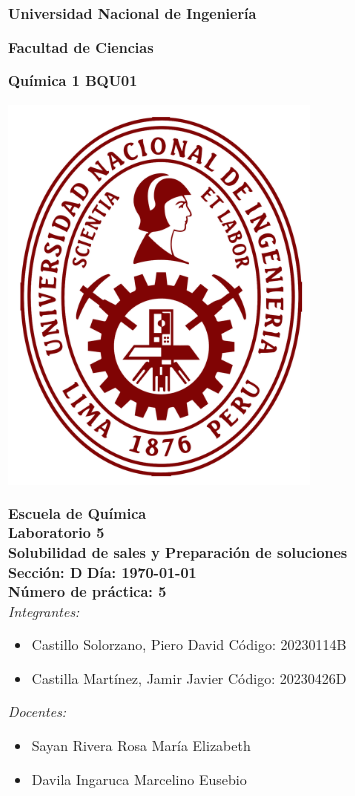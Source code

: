 \documentclass[../main.tex]{subfiles}
\begin{document}
\onecolumn

\begin{center}
\textbf{\fontsize{16}{\baselineskip}\selectfont Universidad Nacional de Ingeniería}

\bigskip

\textbf{\fontsize{16}{\baselineskip}\selectfont Facultad de Ciencias}

\bigskip

\textbf{\fontsize{18}{\baselineskip}\selectfont Química 1 BQU01}

\bigskip

\includegraphics[width=8cm]{uni-logo.png}

\textbf{\fontsize{16}{\baselineskip}\selectfont Escuela de Química}
\bigskip \\
\textbf{\fontsize{20}{\baselineskip}\selectfont Laboratorio 5}
\bigskip \\
\textbf{\fontsize{19}{\baselineskip}\selectfont Solubilidad de sales y Preparación de soluciones}
\bigskip \\
\textbf{\fontsize{18}{\baselineskip}\selectfont Sección: D}
\quad \quad
\textbf{\fontsize{18}{\baselineskip}\selectfont Día: \today}
\bigskip \\
\textbf{\fontsize{16}{\baselineskip}\selectfont Número de práctica: 5}
\bigskip \\

\textit{\fontsize{16}{\baselineskip}\selectfont Integrantes:}

\begin{itemize}
    \item \fontsize{16}{\baselineskip}\selectfont Castillo Solorzano, Piero David   \quad Código: 20230114B
    \item \fontsize{16}{\baselineskip}\selectfont Castilla Martínez, Jamir Javier   \quad Código: 20230426D
\end{itemize}

\textit{\fontsize{16}{\baselineskip}\selectfont Docentes:}

\begin{itemize}
    \item \fontsize{16}{\baselineskip}\selectfont Sayan Rivera Rosa María Elizabeth
    \item \fontsize{16}{\baselineskip}\selectfont Davila Ingaruca Marcelino Eusebio
\end{itemize}

\bigskip
\end{center}

\clearpage
\end{document}
